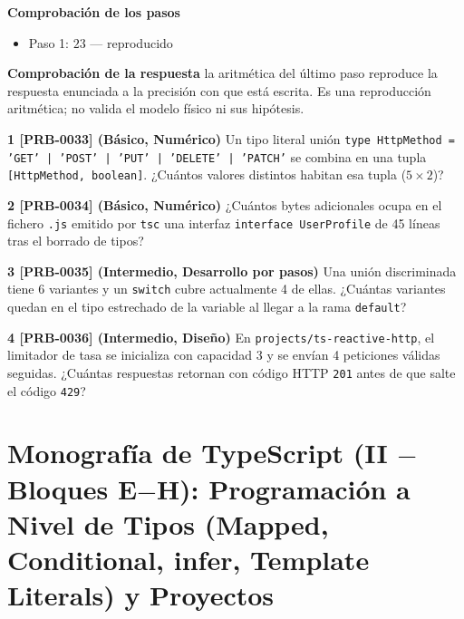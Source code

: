 \documentclass{book}
\begin{document}
\begin{tcolorbox}[title={Problema resuelto}, studiumworked, breakable]
\noindent\textbf{Comprobación de los pasos}
\begin{itemize}
\item Paso 1: $23$ — reproducido
\end{itemize}

\noindent\textbf{Comprobación de la respuesta} la aritmética del último paso reproduce la respuesta enunciada a la precisión con que está escrita. Es una reproducción aritmética; no valida el modelo físico ni sus hipótesis.
\end{tcolorbox}

\begin{tcolorbox}[title={Ejercicios}, studiumworked, breakable]

\noindent\textbf{1 [PRB-0033] (Básico, Numérico)}
Un tipo literal unión \texttt{type HttpMethod = 'GET' | 'POST' | 'PUT' | 'DELETE' | 'PATCH'} se combina en una tupla \texttt{[HttpMethod, boolean]}. ¿Cuántos valores distintos habitan esa tupla (\(5 \times 2\))?

\noindent\textbf{2 [PRB-0034] (Básico, Numérico)}
¿Cuántos bytes adicionales ocupa en el fichero \texttt{.js} emitido por \texttt{tsc} una interfaz \texttt{interface UserProfile} de 45 líneas tras el borrado de tipos?

\noindent\textbf{3 [PRB-0035] (Intermedio, Desarrollo por pasos)}
Una unión discriminada tiene 6 variantes y un \texttt{switch} cubre actualmente 4 de ellas. ¿Cuántas variantes quedan en el tipo estrechado de la variable al llegar a la rama \texttt{default}?

\noindent\textbf{4 [PRB-0036] (Intermedio, Diseño)}
En \texttt{projects/ts-reactive-http}, el limitador de tasa se inicializa con capacidad 3 y se envían 4 peticiones válidas seguidas. ¿Cuántas respuestas retornan con código HTTP \texttt{201} antes de que salte el código \texttt{429}?
\end{tcolorbox}

\chapter{Monografía de TypeScript (II \(-\) Bloques E\(-\)H): Programación a Nivel de Tipos (Mapped, Conditional, infer, Template Literals) y Proyectos}
\label{chap:cap07-typescript-avanzado-experto-mapped-conditional-infer-proyectos}
\end{document}
